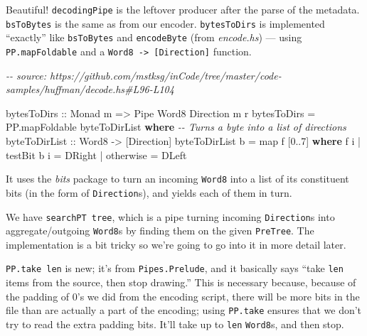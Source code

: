 \documentclass[]{article}
\newenvironment{Shaded}{}{}
\newcommand{\CommentTok}[1]{\textcolor[rgb]{0.38,0.63,0.69}{\textit{#1}}}
\newcommand{\DataTypeTok}[1]{\textcolor[rgb]{0.56,0.13,0.00}{#1}}
\newcommand{\DecValTok}[1]{\textcolor[rgb]{0.25,0.63,0.44}{#1}}
\newcommand{\FunctionTok}[1]{\textcolor[rgb]{0.02,0.16,0.49}{#1}}
\newcommand{\KeywordTok}[1]{\textcolor[rgb]{0.00,0.44,0.13}{\textbf{#1}}}
\newcommand{\NormalTok}[1]{#1}
\newcommand{\OperatorTok}[1]{\textcolor[rgb]{0.40,0.40,0.40}{#1}}
\newcommand{\OtherTok}[1]{\textcolor[rgb]{0.00,0.44,0.13}{#1}}
\begin{document}
Beautiful! \texttt{decodingPipe} is the leftover producer after the parse of the
metadata. \texttt{bsToBytes} is the same as from our encoder.
\texttt{bytesToDirs} is implemented ``exactly'' like \texttt{bsToBytes} and
\texttt{encodeByte} (from \emph{encode.hs}) --- using \texttt{PP.mapFoldable}
and a \texttt{Word8\ -\textgreater{}\ {[}Direction{]}} function.

\begin{Shaded}
\begin{Highlighting}[]
\CommentTok{{-}{-} source: https://github.com/mstksg/inCode/tree/master/code{-}samples/huffman/decode.hs\#L96{-}L104}

\OtherTok{bytesToDirs ::} \DataTypeTok{Monad}\NormalTok{ m }\OtherTok{=>} \DataTypeTok{Pipe} \DataTypeTok{Word8} \DataTypeTok{Direction}\NormalTok{ m r}
\NormalTok{bytesToDirs }\OtherTok{=}\NormalTok{ PP.mapFoldable byteToDirList}
  \KeywordTok{where}
    \CommentTok{{-}{-} Turns a byte into a list of directions}
\OtherTok{    byteToDirList ::} \DataTypeTok{Word8} \OtherTok{{-}>}\NormalTok{ [}\DataTypeTok{Direction}\NormalTok{]}
\NormalTok{    byteToDirList b }\OtherTok{=} \FunctionTok{map}\NormalTok{ f [}\DecValTok{0}\OperatorTok{..}\DecValTok{7}\NormalTok{]}
      \KeywordTok{where}
\NormalTok{        f i }\OperatorTok{|}\NormalTok{ testBit b i }\OtherTok{=} \DataTypeTok{DRight}
            \OperatorTok{|} \FunctionTok{otherwise}   \OtherTok{=} \DataTypeTok{DLeft}
\end{Highlighting}
\end{Shaded}

It uses the \emph{bits} package to turn an incoming \texttt{Word8} into a list
of its constituent bits (in the form of \texttt{Direction}s), and yields each of
them in turn.

We have \texttt{searchPT\ tree}, which is a pipe turning incoming
\texttt{Direction}s into aggregate/outgoing \texttt{Word8}s by finding them on
the given \texttt{PreTree}. The implementation is a bit tricky so we're going to
go into it in more detail later.

\texttt{PP.take\ len} is new; it's from \texttt{Pipes.Prelude}, and it basically
says ``take \texttt{len} items from the source, then stop drawing.'' This is
necessary because, because of the padding of 0's we did from the encoding
script, there will be more bits in the file than are actually a part of the
encoding; using \texttt{PP.take} ensures that we don't try to read the extra
padding bits. It'll take up to \texttt{len} \texttt{Word8}s, and then stop.
\end{document}
